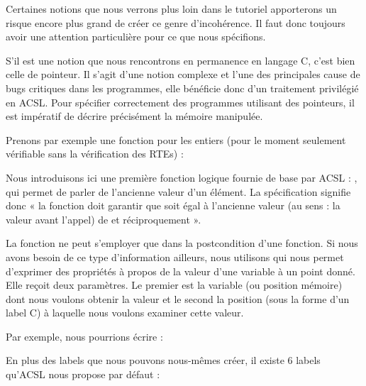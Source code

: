 Certaines notions que nous verrons plus loin dans le tutoriel apporterons un
risque encore plus grand de créer ce genre d'incohérence. Il faut donc toujours
avoir une attention particulière pour ce que nous spécifions.





S'il est une notion que nous rencontrons en permanence en
langage C, c'est bien celle de pointeur. Il s'agit d'une notion complexe et
l'une des principales cause de bugs critiques dans les programmes, elle
bénéficie donc d'un traitement privilégié en ACSL. Pour spécifier correctement
des programmes utilisant des pointeurs, il est impératif de décrire précisément
la mémoire manipulée.



Prenons par exemple une fonction  pour les entiers (pour
le moment seulement vérifiable sans la vérification des RTEs) :








Nous introduisons ici une première fonction logique fournie de base par
ACSL : , qui permet de parler de l'ancienne
valeur d'un élément. La spécification signifie donc « la fonction
doit garantir que  soit égal à l'ancienne valeur (au sens : la
valeur avant l'appel) de  et réciproquement ».



La fonction  ne peut s'employer que dans la
postcondition d'une fonction. Si nous avons besoin de ce type d'information
ailleurs, nous utilisons  qui nous permet
d'exprimer des propriétés à propos de la
valeur d'une variable à un point donné. Elle reçoit deux paramètres. Le premier
est la variable (ou position mémoire) dont nous voulons obtenir la valeur et le
second la position (sous la forme d'un label C) à laquelle nous voulons
examiner cette valeur.



Par exemple, nous pourrions écrire :






En plus des labels que nous pouvons nous-mêmes créer, il existe 6 labels
qu'ACSL nous propose par défaut :




